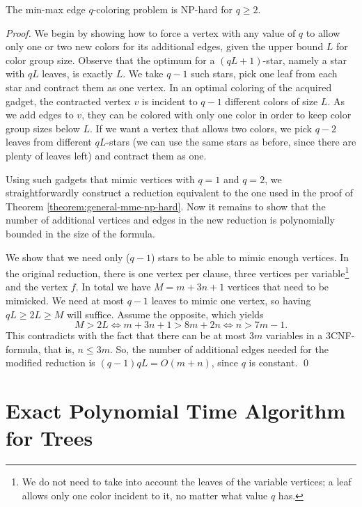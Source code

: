 \documentclass[runningheads, a4paper]{llncs}
\begin{document}
\begin{theorem}
The min-max edge $q$-coloring problem is NP-hard for $q \geq 2$.
\end{theorem}
\begin{proof}
We begin by showing how to force a vertex with any value of $q$ to allow only one or two new colors for its additional edges, given the upper bound $L$ for color group size. Observe that the optimum for a $(qL+1)$-star, namely a star with $qL$ leaves, is exactly $L$. We take $q-1$ such stars, pick one leaf from each star and contract them as one vertex. In an optimal coloring of the acquired gadget, the contracted vertex $v$ is incident to $q-1$ different colors of size $L$. As we add edges to $v$, they can be colored with only one color in order to keep color group sizes below $L$. If we want a vertex that allows two colors, we pick $q-2$ leaves from different $qL$-stars (we can use the same stars as before, since there are plenty of leaves left) and contract them as one.

Using such gadgets that mimic vertices with $q=1$ and $q=2$, we straightforwardly construct a reduction equivalent to the one used in the proof of Theorem \ref{theorem:general-mme-np-hard}. Now it remains to show that the number of additional vertices and edges in the new reduction is polynomially bounded in the size of the formula.

We show that we need only ($q-1$) stars to be able to mimic enough vertices. In the original reduction, there is one vertex per clause, three vertices per variable\footnote{We do not need to take into account the leaves of the variable vertices; a leaf allows only one color incident to it, no matter what value $q$ has.} and the vertex $f$. In total we have $M = m + 3n + 1$ vertices that need to be mimicked. We need at most $q-1$ leaves to mimic one vertex, so having $qL \geq 2L \geq M$ will suffice. Assume the opposite, which yields
\begin{displaymath}
M > 2L \Leftrightarrow m + 3n + 1 > 8m + 2n \Leftrightarrow n > 7m - 1.
\end{displaymath}
This contradicts with the fact that there can be at most $3m$ variables in a 3CNF-formula, that is, $n \leq 3m$. So, the number of additional edges needed for the modified reduction is $(q-1)qL = O(m+n)$, since $q$ is constant. \qed
\end{proof}


\section{Exact Polynomial Time Algorithm for Trees}\label{sect:polytree}
\end{document}
